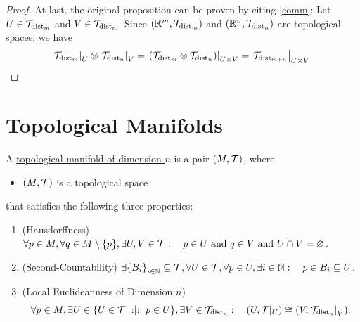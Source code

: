 \documentclass[11pt,reqno]{amsart}
\begin{document}
\begin{proof}
At last, the original proposition can be proven by citing \ref{comm}:
Let $U\in\mathcal{T}_{\mathrm{dist}_m}$ and $V\in\mathcal{T}_{\mathrm{dist}_n}$.
Since $\Br{\R^m,\T_{\dist_m}}$ and $\Br{\R^n,\T_{\dist_n}}$
are topological spaces, we have
\[
\eval{\T_{\dist_m}}_U\otimes\eval{\T_{\dist_n}}_V
=\eval{(\T_{\dist_m}\otimes\T_{\dist_n})}_{U\times V}
=\eval{\T_{\dist_{m+n}}}_{U\times V}.
\]
\end{proof}

\section{Topological Manifolds}
\begin{Def}
A \ul{topological manifold of dimension $n$} is a pair $(M,\mathcal{T})$, where
\begin{itemize}
\item $(M,\mathcal{T})$ is a topological space
\end{itemize}
that satisfies the following three properties:
\begin{enumerate}
\item(Hausdorffness)
$\forall p\in M,\forall q\in M\setminus\set{p},\exists U,V\in\T:\quad
p\in U\tand q\in V\tand U\cap V=\varnothing$.
\item(Second-Countability)
$\exists\set{B_i}_{i\in\N}\subseteq\T,
\forall U\in\T,\forall p\in U,\exists i\in\N:\quad p\in B_i\subseteq U
$.
\item(Local Euclideanness of Dimension $n$)
\[\forall p\in M,\exists U\in\set{U\in\T\st p\in U},\exists V\in\T_{\dist_n}:
\quad (U,\T|_U)\cong \Br{V,\eval{\T_{\dist_n}}_V}.\]
\end{enumerate}
\end{Def}
\end{document}
